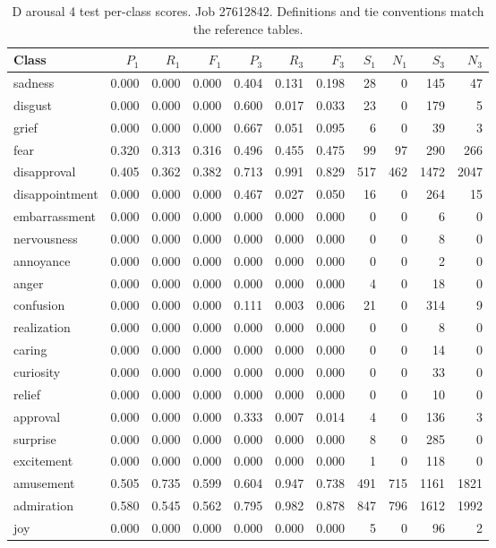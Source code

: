 \begin{table}[!htbp]
\centering
\scriptsize
\setlength{\tabcolsep}{5pt}
\begin{tabular}{lrrrrrrrrrr}
\toprule
Class & $P_1$ & $R_1$ & $F_1$ & $P_3$ & $R_3$ & $F_3$ & $S_1$ & $N_1$ & $S_3$ & $N_3$ \\
\midrule
sadness & 0.000 & 0.000 & 0.000 & 0.404 & 0.131 & 0.198 & 28 & 0 & 145 & 47 \\
disgust & 0.000 & 0.000 & 0.000 & 0.600 & 0.017 & 0.033 & 23 & 0 & 179 & 5 \\
grief & 0.000 & 0.000 & 0.000 & 0.667 & 0.051 & 0.095 & 6 & 0 & 39 & 3 \\
fear & 0.320 & 0.313 & 0.316 & 0.496 & 0.455 & 0.475 & 99 & 97 & 290 & 266 \\
disapproval & 0.405 & 0.362 & 0.382 & 0.713 & 0.991 & 0.829 & 517 & 462 & 1472 & 2047 \\
disappointment & 0.000 & 0.000 & 0.000 & 0.467 & 0.027 & 0.050 & 16 & 0 & 264 & 15 \\
embarrassment & 0.000 & 0.000 & 0.000 & 0.000 & 0.000 & 0.000 & 0 & 0 & 6 & 0 \\
nervousness & 0.000 & 0.000 & 0.000 & 0.000 & 0.000 & 0.000 & 0 & 0 & 8 & 0 \\
annoyance & 0.000 & 0.000 & 0.000 & 0.000 & 0.000 & 0.000 & 0 & 0 & 2 & 0 \\
anger & 0.000 & 0.000 & 0.000 & 0.000 & 0.000 & 0.000 & 4 & 0 & 18 & 0 \\
confusion & 0.000 & 0.000 & 0.000 & 0.111 & 0.003 & 0.006 & 21 & 0 & 314 & 9 \\
realization & 0.000 & 0.000 & 0.000 & 0.000 & 0.000 & 0.000 & 0 & 0 & 8 & 0 \\
caring & 0.000 & 0.000 & 0.000 & 0.000 & 0.000 & 0.000 & 0 & 0 & 14 & 0 \\
curiosity & 0.000 & 0.000 & 0.000 & 0.000 & 0.000 & 0.000 & 0 & 0 & 33 & 0 \\
relief & 0.000 & 0.000 & 0.000 & 0.000 & 0.000 & 0.000 & 0 & 0 & 10 & 0 \\
approval & 0.000 & 0.000 & 0.000 & 0.333 & 0.007 & 0.014 & 4 & 0 & 136 & 3 \\
surprise & 0.000 & 0.000 & 0.000 & 0.000 & 0.000 & 0.000 & 8 & 0 & 285 & 0 \\
excitement & 0.000 & 0.000 & 0.000 & 0.000 & 0.000 & 0.000 & 1 & 0 & 118 & 0 \\
amusement & 0.505 & 0.735 & 0.599 & 0.604 & 0.947 & 0.738 & 491 & 715 & 1161 & 1821 \\
admiration & 0.580 & 0.545 & 0.562 & 0.795 & 0.982 & 0.878 & 847 & 796 & 1612 & 1992 \\
joy & 0.000 & 0.000 & 0.000 & 0.000 & 0.000 & 0.000 & 5 & 0 & 96 & 2 \\
\bottomrule
\end{tabular}
\caption{D arousal 4 test per-class scores. Job 27612842. Definitions and tie conventions match the reference tables.}
\label{tab:classes-d_arousal_k4}
\end{table}

